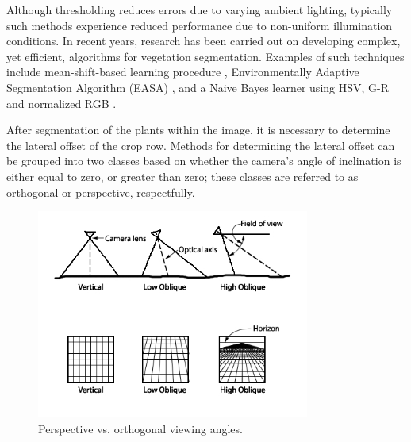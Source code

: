 \documentclass[authoryear]{elsarticle}
\begin{document}
Although thresholding reduces errors due to varying ambient
lighting, typically such methods experience reduced performance due to
non-uniform illumination conditions. In recent years,
research has been carried out on developing complex, yet efficient,
algorithms for vegetation segmentation. Examples of such techniques
include mean-shift-based learning procedure \citep{zheng2009},
Environmentally Adaptive Segmentation Algorithm (EASA)
\citep{tian1998}, and a Naive Bayes learner using HSV, G-R and
normalized RGB \citet{moorthy2015}.

After segmentation of the plants within the image, it is necessary to
determine the lateral offset of the crop row. Methods for determining
the lateral offset can be grouped into two classes based on whether
the camera’s angle of inclination is either equal to zero, or greater
than zero; these classes are referred to as orthogonal or perspective,
respectfully. 

\begin{figure}
  \centering
  \includegraphics[width=0.8\textwidth,natwidth=610,natheight=642]{oblique_projection.jpg}
  \caption{Perspective vs. orthogonal viewing angles.}
  \label{fig:projection}
\end{figure}
\end{document}
